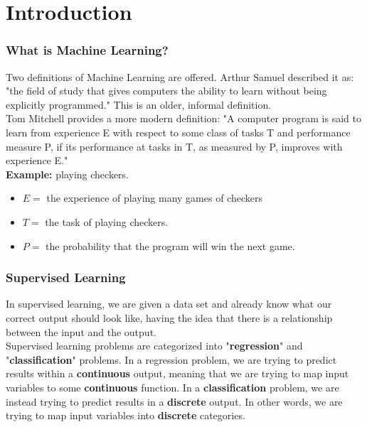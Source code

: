 \documentclass[english]{article}
\begin{document}
\part*{Introduction}


\section{What is Machine Learning?}
Two definitions of Machine Learning are offered. Arthur Samuel described it as:
"the field of study that gives computers the ability to learn without being
explicitly programmed." This is an older, informal definition.\\

Tom Mitchell provides a more modern definition: "A computer program is said to
learn from experience E with respect to some class of tasks T and performance
measure P, if its performance at tasks in T, as measured by P, improves with
experience E."\\

\textbf{Example:} playing checkers.

\begin{itemize}
\item $E =$ the experience of playing many games of checkers
\item $T =$ the task of playing checkers.
\item $P =$ the probability that the program will win the next game.
\end{itemize}

\section{Supervised Learning}
In supervised learning, we are given a data set and already know what our
correct output should look like, having the idea that there is a relationship
between the input and the output.\\

Supervised learning problems are categorized into "\textbf{regression}" and
"\textbf{classification}" problems. In a regression problem, we are trying to
predict results within a \textbf{continuous} output, meaning that we are trying
to map input variables to some \textbf{continuous} function. In a
\textbf{classification} problem, we are instead trying to predict results in a
\textbf{discrete} output. In other words, we are trying to map input variables
into \textbf{discrete} categories.\\
\end{document}
